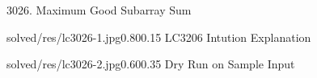 \begin{problem}{3026. Maximum Good Subarray Sum}
    

\end{problem}

\begin{solution}[Ad-Hoc | $O(n^2)$ ]


    \begin{lfigurecp}{solved/res/lc3026-1.jpg}{0.80}{0.15}
        LC3206 Intution Explanation
    \end{lfigurecp}


    \begin{lfigurecp}{solved/res/lc3026-2.jpg}{0.60}{0.35}
        Dry Run on Sample Input
    \end{lfigurecp}
\end{solution}
    